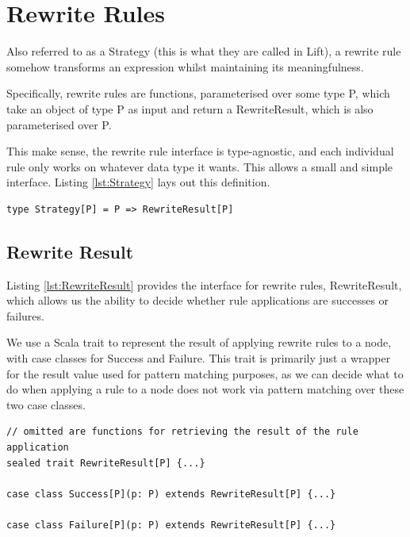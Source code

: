 \documentclass{l4proj}
\begin{document}
\section{Rewrite Rules}


Also referred to as a Strategy (this is what they are called in Lift), a rewrite rule somehow transforms an expression whilst maintaining its meaningfulness.

Specifically, rewrite rules are functions, parameterised over some type P, which take an object of type P as input and return a RewriteResult, which is also parameterised over P.

This make sense, the rewrite rule interface is type-agnostic, and each individual rule only works on whatever data type it wants. This allows a small and simple interface. Listing \ref{lst:Strategy} lays out this definition.

\begin{lstlisting}[caption={Definition of a Rewrite Rule as a type alias}, label={lst:Strategy}]
type Strategy[P] = P => RewriteResult[P]
\end{lstlisting}


\subsection{Rewrite Result}

Listing \ref{lst:RewriteResult} provides the interface for rewrite rules, RewriteResult, which allows us the ability to decide whether rule applications are successes or failures.

We use a Scala trait to represent the result of applying rewrite rules to a node, with case classes for Success and Failure. This trait is primarily just a wrapper for the result value used for pattern matching purposes, as we can decide what to do when applying a rule to a node does not work via pattern matching over these two case classes.

\begin{lstlisting}[caption={Definition of RewriteResult trait for handling the result of applying rewrite rules}, label={lst:RewriteResult}]
// omitted are functions for retrieving the result of the rule application 
sealed trait RewriteResult[P] {...}

case class Success[P](p: P) extends RewriteResult[P] {...}

case class Failure[P](p: P) extends RewriteResult[P] {...}
\end{lstlisting}
\end{document}
